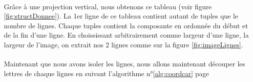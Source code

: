 \documentclass[a4paper]{article}
\begin{document}
			\paragraph{} Grâce à une projection vertical, nous obtenons ce tableau (voir figure \ref{fig:structDonnee}). La 1er ligne de ce tableau contient autant de tuples que le nombre de lignes. Chaque tuples contient la composante en ordonnée du début et de la fin d'une ligne. En choississant arbitrairement comme largeur d'une ligne, la largeur de l'image, on extrait nos 2 lignes comme sur la figure \ref{fig:imageLignes}.
			\paragraph{} Maintenant que nous avons isoler les lignes, nous allons maintenant découper les lettres de chaque lignes en suivant l'algorithme n°\ref{alg:coordcar} page \pageref{alg:coordcar}
\end{document}
